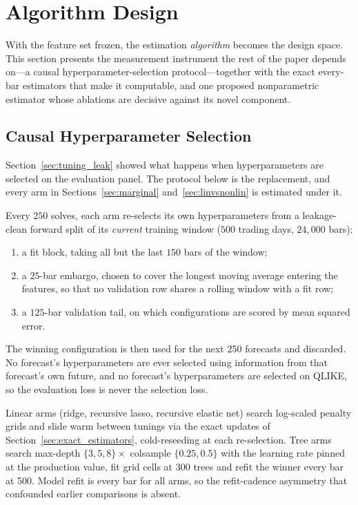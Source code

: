 \section{Algorithm Design}
\label{sec:algorithms}

With the feature set frozen, the estimation \emph{algorithm} becomes the design
space. This section presents the measurement instrument the rest of the paper
depends on---a causal hyperparameter-selection protocol---together with the
exact every-bar estimators that make it computable, and one proposed
nonparametric estimator whose ablations are decisive against its novel
component.

\subsection{Causal Hyperparameter Selection}
\label{sec:causal_tuning}

Section~\ref{sec:tuning_leak} showed what happens when hyperparameters are
selected on the evaluation panel. The protocol below is the replacement, and
every arm in Sections~\ref{sec:marginal} and~\ref{sec:linvsnonlin} is estimated
under it.

Every $250$ solves, each arm re-selects its own hyperparameters from a
leakage-clean forward split of its \emph{current} training window
($500$ trading days, $24{,}000$ bars):

\begin{enumerate}
  \item a fit block, taking all but the last $150$ bars of the window;
  \item a $25$-bar embargo, chosen to cover the longest moving average
    entering the features, so that no validation row shares a rolling window
    with a fit row;
  \item a $125$-bar validation tail, on which configurations are scored by
    mean squared error.
\end{enumerate}

The winning configuration is then used for the next $250$ forecasts and
discarded. No forecast's hyperparameters are ever selected using information
from that forecast's own future, and no forecast's hyperparameters are selected
on QLIKE, so the evaluation loss is never the selection loss.

Linear arms (ridge, recursive lasso, recursive elastic net) search log-scaled
penalty grids and slide warm between tunings via the exact updates of
Section~\ref{sec:exact_estimators}, cold-reseeding at each re-selection. Tree
arms search max-depth $\{3,5,8\} \times$ colsample $\{0.25, 0.5\}$ with the
learning rate pinned at the production value, fit grid cells at 300 trees and
refit the winner every bar at 500. Model refit is every bar for all arms, so
the refit-cadence asymmetry that confounded earlier comparisons is absent.

